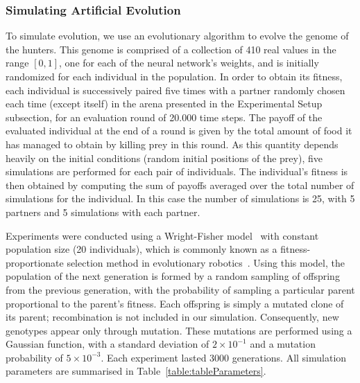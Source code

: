     \subsubsection{Simulating Artificial Evolution} 
    \label{artificialEvolution}
      To simulate evolution, we use an evolutionary algorithm to evolve the genome of the hunters. This genome is comprised of a collection of 410 real values in the range \([0,1]\), one for each of the neural network's weights, and is initially randomized for each individual in the population. In order to obtain its fitness, each individual is successively paired five times with a partner randomly chosen each time (except itself) in the arena presented in the Experimental Setup subsection, for an evaluation round of 20.000 time steps. The payoff of the evaluated individual at the end of a round is given by the total amount of food it has managed to obtain by killing prey in this round. As this quantity depends heavily on the initial conditions (random initial positions of the prey), five simulations are performed for each pair of individuals. The individual's fitness is then obtained by computing the sum of payoffs averaged over the total number of simulations for the individual. In this case the number of simulations is 25, with 5 partners and 5 simulations with each partner.

      Experiments were conducted using a Wright-Fisher model~\parencite{Wright1931} with constant population size (20 individuals), which is commonly known as a fitness-proportionate selection method in evolutionary robotics~\parencite{Eiben2003}. Using this model, the population of the next generation is formed by a random sampling of offspring from the previous generation, with the probability of sampling a particular parent proportional to the parent's fitness. Each offspring is simply a mutated clone of its parent; recombination is not included in our simulation. Consequently, new genotypes appear only through mutation. These mutations are performed using a Gaussian function, with a standard deviation of \(2 \times 10^{-1}\) and a mutation probability of \(5 \times 10^{-3}\). Each experiment lasted 3000 generations. All simulation parameters are summarised in Table~\ref{table:tableParameters}.

